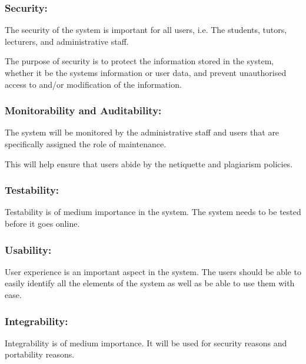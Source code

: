\subsubsection{Security:} 
The security of the system is important for all users, i.e. The students, tutors, lecturers, and administrative staff.

The purpose of security is to protect the information stored in the system, whether it be the systems information or user data, and prevent unauthorised access to and/or modification of the information.
 
	\subsubsection{Monitorability and Auditability:} 
The system will be monitored by the administrative staff and users that are specifically assigned the role of maintenance. 

This will help ensure that users abide by the netiquette and plagiarism policies.  
			
	\subsubsection{Testability:} 
		
	Testability is of medium importance in the system. The system needs to be tested before it goes online. 
		
		
	\subsubsection{Usability:} 
		
		User experience is an important aspect in the system. The users should be able to easily identify all the elements of the system as well as be able to use them with ease.
		

	\subsubsection{Integrability:} 
		
	Integrability is of medium importance. It will be used for security reasons and portability reasons. 

	

